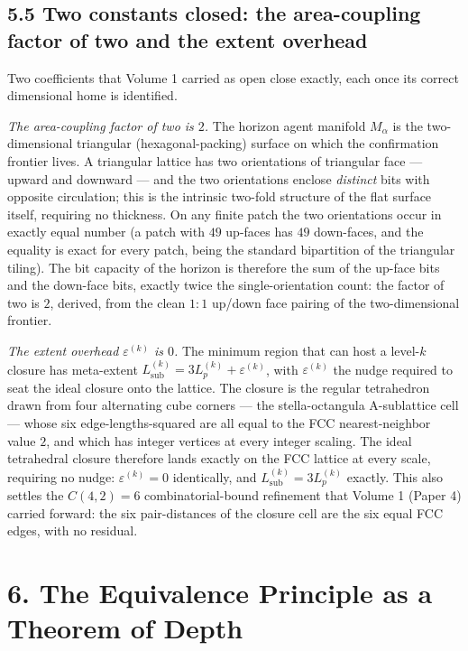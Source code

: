 \documentclass[11pt,oneside]{report}
\theoremstyle{definition}
\theoremstyle{remark}
\begin{document}
\subsection*{5.5 Two constants closed: the area-coupling factor of two and
the extent overhead}

Two coefficients that Volume 1 carried as open close exactly, each once
its correct dimensional home is identified.

\emph{The area-coupling factor of two is \ensuremath{2}.} The horizon agent manifold
\ensuremath{M_{\alpha}} is the two-dimensional triangular (hexagonal-packing) surface on
which the confirmation frontier lives. A triangular lattice has two
orientations of triangular face --- upward and downward --- and the two
orientations enclose \emph{distinct} bits with opposite circulation; this
is the intrinsic two-fold structure of the flat surface itself, requiring
no thickness. On any finite patch the two orientations occur in exactly
equal number (a patch with \ensuremath{49} up-faces has \ensuremath{49} down-faces, and the
equality is exact for every patch, being the standard bipartition of the
triangular tiling). The bit capacity of the horizon is therefore the sum
of the up-face bits and the down-face bits, exactly twice the
single-orientation count: the factor of two is \ensuremath{2}, derived, from the
clean \ensuremath{1\!:\!1} up/down face pairing of the two-dimensional frontier.

\emph{The extent overhead \ensuremath{\varepsilon^{(k)}} is \ensuremath{0}.} The minimum region that can
host a level-\ensuremath{k} closure has meta-extent
\ensuremath{L_{\mathrm{sub}}^{(k)} = 3 L_p^{(k)} + \varepsilon^{(k)}}, with \ensuremath{\varepsilon^{(k)}} the nudge
required to seat the ideal closure onto the lattice. The closure is the
regular tetrahedron drawn from four alternating cube corners --- the
stella-octangula A-sublattice cell --- whose six edge-lengths-squared are
all equal to the FCC nearest-neighbor value \ensuremath{2}, and which has integer
vertices at every integer scaling. The ideal tetrahedral closure
therefore lands exactly on the FCC lattice at every scale, requiring no
nudge: \ensuremath{\varepsilon^{(k)} = 0} identically, and \ensuremath{L_{\mathrm{sub}}^{(k)} = 3 L_p^{(k)}}
exactly. This also settles the \ensuremath{C(4,2) = 6} combinatorial-bound
refinement that Volume 1 (Paper 4) carried forward: the six pair-distances
of the closure cell are the six equal FCC edges, with no residual.

\section*{6. The Equivalence Principle as a Theorem of Depth}
\end{document}
